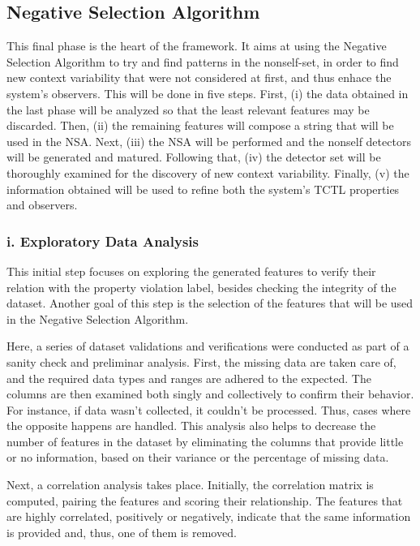 \subsection{Negative Selection Algorithm}

This final phase is the heart of the framework. It aims at using the Negative Selection Algorithm to try and find patterns in the nonself-set, in order to find new context variability that were not considered at first, and thus enhace the system's observers. This will be done in five steps. First, (i) the data obtained in the last phase will be analyzed so that the least relevant features may be discarded. Then, (ii) the remaining features will compose a string that will be used in the NSA. Next, (iii) the NSA will be performed and the nonself detectors will be generated and matured. Following that, (iv) the detector set will be thoroughly examined for the discovery of new context variability. Finally, (v) the information obtained will be used to refine both the system's TCTL properties and observers.

\subsubsection{i. Exploratory Data Analysis}

This initial step focuses on exploring the generated features to verify their relation with the property violation label, besides checking the integrity of the dataset. Another goal of this step is the selection of the features that will be used in the Negative Selection Algorithm.

Here, a series of dataset validations and verifications were conducted as part of a sanity check and preliminar analysis. First, the missing data are taken care of, and the required data types and ranges are adhered to the expected. The columns are then examined both singly and collectively to confirm their behavior. For instance, if data wasn't collected, it couldn't be processed. Thus, cases where the opposite happens are handled. This analysis also helps to decrease the number of features in the dataset by eliminating the columns that provide little or no information, based on their variance or the percentage of missing data.

Next, a correlation analysis takes place. Initially, the correlation matrix is computed, pairing the features and scoring their relationship. The features that are highly correlated, positively or negatively, indicate that the same information is provided and, thus, one of them is removed.


